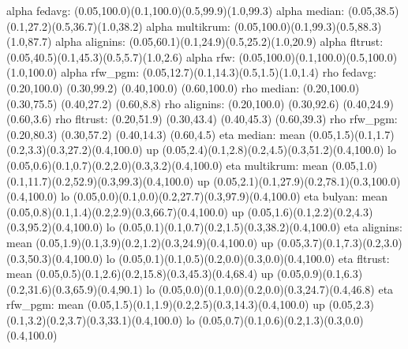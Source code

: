 alpha fedavg: (0.05,100.0)(0.1,100.0)(0.5,99.9)(1.0,99.3)
alpha median: (0.05,38.5)(0.1,27.2)(0.5,36.7)(1.0,38.2)
alpha multikrum: (0.05,100.0)(0.1,99.3)(0.5,88.3)(1.0,87.7)
alpha alignins: (0.05,60.1)(0.1,24.9)(0.5,25.2)(1.0,20.9)
alpha fltrust: (0.05,40.5)(0.1,45.3)(0.5,5.7)(1.0,2.6)
alpha rfw: (0.05,100.0)(0.1,100.0)(0.5,100.0)(1.0,100.0)
alpha rfw_pgm: (0.05,12.7)(0.1,14.3)(0.5,1.5)(1.0,1.4)
rho fedavg: (0.20,100.0) (0.30,99.2) (0.40,100.0) (0.60,100.0)
rho median: (0.20,100.0) (0.30,75.5) (0.40,27.2) (0.60,8.8)
rho alignins: (0.20,100.0) (0.30,92.6) (0.40,24.9) (0.60,3.6)
rho fltrust: (0.20,51.9) (0.30,43.4) (0.40,45.3) (0.60,39.3)
rho rfw_pgm: (0.20,80.3) (0.30,57.2) (0.40,14.3) (0.60,4.5)
eta median: mean (0.05,1.5)(0.1,1.7)(0.2,3.3)(0.3,27.2)(0.4,100.0) up (0.05,2.4)(0.1,2.8)(0.2,4.5)(0.3,51.2)(0.4,100.0) lo (0.05,0.6)(0.1,0.7)(0.2,2.0)(0.3,3.2)(0.4,100.0)
eta multikrum: mean (0.05,1.0)(0.1,11.7)(0.2,52.9)(0.3,99.3)(0.4,100.0) up (0.05,2.1)(0.1,27.9)(0.2,78.1)(0.3,100.0)(0.4,100.0) lo (0.05,0.0)(0.1,0.0)(0.2,27.7)(0.3,97.9)(0.4,100.0)
eta bulyan: mean (0.05,0.8)(0.1,1.4)(0.2,2.9)(0.3,66.7)(0.4,100.0) up (0.05,1.6)(0.1,2.2)(0.2,4.3)(0.3,95.2)(0.4,100.0) lo (0.05,0.1)(0.1,0.7)(0.2,1.5)(0.3,38.2)(0.4,100.0)
eta alignins: mean (0.05,1.9)(0.1,3.9)(0.2,1.2)(0.3,24.9)(0.4,100.0) up (0.05,3.7)(0.1,7.3)(0.2,3.0)(0.3,50.3)(0.4,100.0) lo (0.05,0.1)(0.1,0.5)(0.2,0.0)(0.3,0.0)(0.4,100.0)
eta fltrust: mean (0.05,0.5)(0.1,2.6)(0.2,15.8)(0.3,45.3)(0.4,68.4) up (0.05,0.9)(0.1,6.3)(0.2,31.6)(0.3,65.9)(0.4,90.1) lo (0.05,0.0)(0.1,0.0)(0.2,0.0)(0.3,24.7)(0.4,46.8)
eta rfw_pgm: mean (0.05,1.5)(0.1,1.9)(0.2,2.5)(0.3,14.3)(0.4,100.0) up (0.05,2.3)(0.1,3.2)(0.2,3.7)(0.3,33.1)(0.4,100.0) lo (0.05,0.7)(0.1,0.6)(0.2,1.3)(0.3,0.0)(0.4,100.0)